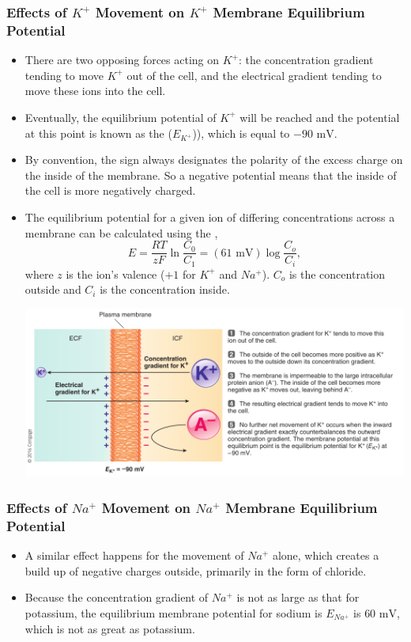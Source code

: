 \documentclass{article}
\numberwithin{equation}{section}
\begin{document}
\subsubsection{Effects of \texorpdfstring{$K^+$}{K+} Movement on \texorpdfstring{$K^+$}{K+} Membrane Equilibrium Potential}
\begin{itemize}
    \item There are two opposing forces acting on $K^+$: the concentration gradient tending to move $K^+$ out of the cell, and the electrical gradient tending to move these ions into the cell.
    \item Eventually, the equilibrium potential of $K^+$ will be reached and the potential at this point is known as the  ($E_{K^+}$)), which is equal to $-90\text{ mV}.$
    \item By convention, the sign always designates the polarity of the excess charge on the inside of the membrane. So a negative potential means that the inside of the cell is more negatively charged.
    \item The equilibrium potential for a given ion of differing concentrations across a membrane can be calculated using the ,
    \begin{equation}
        E = \frac{RT}{zF}\ln\frac{C_0}{C_1} = (61\text{ mV})\log\frac{C_o}{C_i},
    \end{equation}
    where $z$ is the ion's valence ($+1$ for $K^+$ and $Na^{+}$). $C_o$ is the concentration outside and $C_i$ is the concentration inside.
    \begin{center}
        \includegraphics[width=0.8\linewidth]{figures/potassium_equilibrium.png}
    \end{center}
\end{itemize}
\subsubsection{Effects of \texorpdfstring{$Na^+$}{Na+} Movement on \texorpdfstring{$Na^+$}{Na+} Membrane Equilibrium Potential}
\begin{itemize}
    \item A similar effect happens for the movement of $Na^+$ alone, which creates a build up of negative charges outside, primarily in the form of chloride.
    \item Because the concentration gradient of $Na^+$ is not as large as that for potassium, the equilibrium membrane potential for sodium is $E_{Na^+}$ is $60\text{ mV}$, which is not as great as potassium.
\end{itemize}
\end{document}
